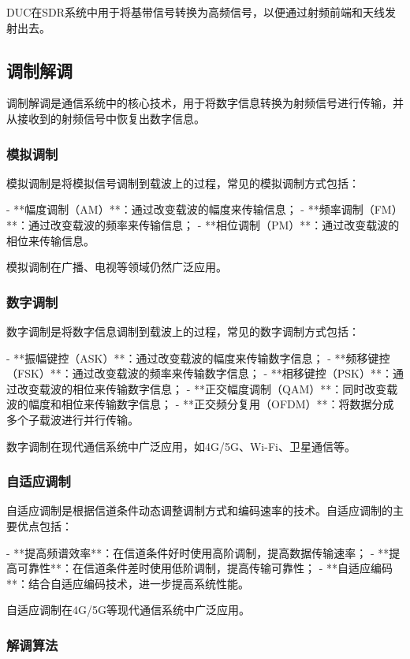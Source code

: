 ﻿\documentclass[UTF8]{ctexbook}
\begin{document}
DUC在SDR系统中用于将基带信号转换为高频信号，以便通过射频前端和天线发射出去。
\subsection{调制解调}

调制解调是通信系统中的核心技术，用于将数字信息转换为射频信号进行传输，并从接收到的射频信号中恢复出数字信息。

\subsubsection{模拟调制}

模拟调制是将模拟信号调制到载波上的过程，常见的模拟调制方式包括：

- **幅度调制（AM）**：通过改变载波的幅度来传输信息；
- **频率调制（FM）**：通过改变载波的频率来传输信息；
- **相位调制（PM）**：通过改变载波的相位来传输信息。

模拟调制在广播、电视等领域仍然广泛应用。

\subsubsection{数字调制}

数字调制是将数字信息调制到载波上的过程，常见的数字调制方式包括：

- **振幅键控（ASK）**：通过改变载波的幅度来传输数字信息；
- **频移键控（FSK）**：通过改变载波的频率来传输数字信息；
- **相移键控（PSK）**：通过改变载波的相位来传输数字信息；
- **正交幅度调制（QAM）**：同时改变载波的幅度和相位来传输数字信息；
- **正交频分复用（OFDM）**：将数据分成多个子载波进行并行传输。

数字调制在现代通信系统中广泛应用，如4G/5G、Wi-Fi、卫星通信等。

\subsubsection{自适应调制}

自适应调制是根据信道条件动态调整调制方式和编码速率的技术。自适应调制的主要优点包括：

- **提高频谱效率**：在信道条件好时使用高阶调制，提高数据传输速率；
- **提高可靠性**：在信道条件差时使用低阶调制，提高传输可靠性；
- **自适应编码**：结合自适应编码技术，进一步提高系统性能。

自适应调制在4G/5G等现代通信系统中广泛应用。

\subsubsection{解调算法}
\end{document}
